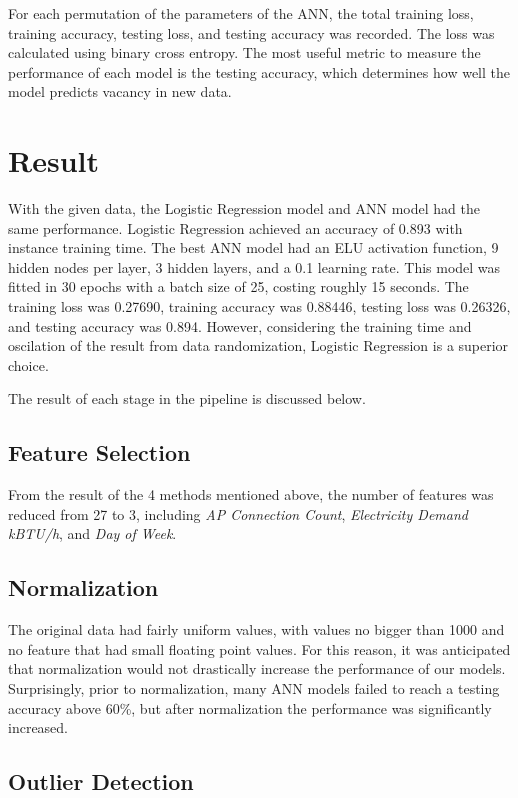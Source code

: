 \documentclass[letterpaper, 12 pt, conference]{ieeeconf}  %
\begin{document}
For each permutation of the parameters of the ANN, the total training loss, training accuracy, testing loss, and testing accuracy was recorded. The loss was calculated using binary cross entropy. The most useful metric to measure the performance of each model is the testing accuracy, which determines how well the model predicts vacancy in new data.

\section{Result}

With the given data, the Logistic Regression model and ANN model had the same performance. Logistic Regression achieved an accuracy of 0.893 with instance training time. The best ANN model had an ELU activation function, 9 hidden nodes per layer, 3 hidden layers, and a 0.1 learning rate. This model was fitted in 30 epochs with a batch size of 25, costing roughly 15 seconds. The training loss was 0.27690, training accuracy was 0.88446, testing loss was 0.26326, and testing accuracy was 0.894. However, considering the training time and oscilation of the result from data randomization, Logistic Regression is a superior choice.

The result of each stage in the pipeline is discussed below.

\subsection{Feature Selection}

From the result of the 4 methods mentioned above, the number of features was reduced from 27 to 3, including \textit{AP Connection Count}, \textit{Electricity Demand kBTU/h}, and \textit{Day of Week}.

\subsection{Normalization}

The original data had fairly uniform values, with values no bigger than 1000 and no feature that had small floating point values. For this reason, it was anticipated that normalization would not drastically increase the performance of our models. Surprisingly, prior to normalization, many ANN models failed to reach a testing accuracy above 60\%, but after normalization the performance was significantly increased.

\subsection{Outlier Detection}
\end{document}
